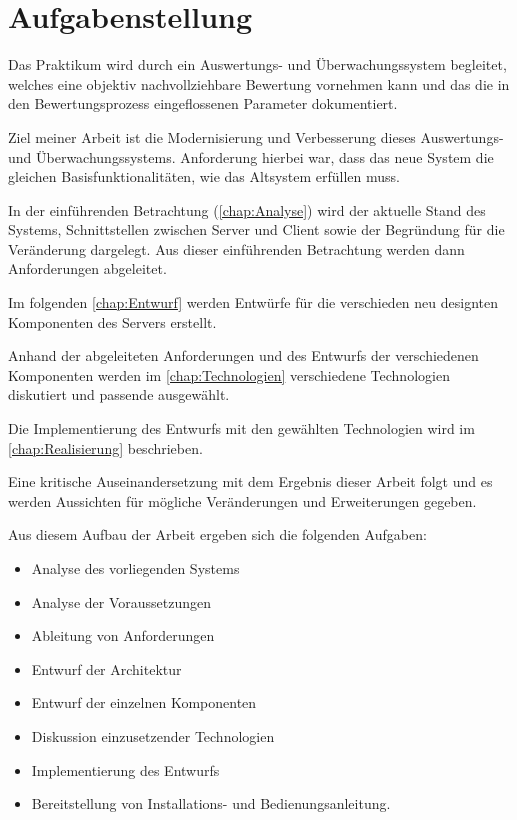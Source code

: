 \section{Aufgabenstellung}
\label{sec:Aufgabenstellung}
Das Praktikum wird durch ein Auswertungs- und Überwachungssystem begleitet, welches eine objektiv nachvollziehbare Bewertung vornehmen kann und das die in den Bewertungsprozess eingeflossenen Parameter dokumentiert. \cite[S. 2]{sosnaKonzeptionUndRealisierung2010}

Ziel meiner Arbeit ist die Modernisierung und Verbesserung dieses Auswertungs- und Überwachungssystems. Anforderung hierbei war, dass das neue System die gleichen Basisfunktionalitäten, wie das Altsystem erfüllen muss.

In der einführenden Betrachtung (\autoref{chap:Analyse}) wird der aktuelle Stand des Systems, Schnittstellen zwischen Server und Client sowie der Begründung für die Veränderung dargelegt. Aus dieser einführenden Betrachtung werden dann Anforderungen abgeleitet.

Im folgenden \autoref{chap:Entwurf} werden Entwürfe für die verschieden neu designten Komponenten des Servers erstellt. 

Anhand der abgeleiteten Anforderungen und des Entwurfs der verschiedenen Komponenten werden im \autoref{chap:Technologien} verschiedene Technologien diskutiert und passende ausgewählt.

Die Implementierung des Entwurfs mit den gewählten Technologien wird im \autoref{chap:Realisierung} beschrieben.

Eine kritische Auseinandersetzung mit dem Ergebnis dieser Arbeit folgt und es werden Aussichten für mögliche Veränderungen und Erweiterungen gegeben.

Aus diesem Aufbau der Arbeit ergeben sich die folgenden Aufgaben:
\begin{itemize}
	\item Analyse des vorliegenden Systems
	\item Analyse der Voraussetzungen
	\item Ableitung von Anforderungen
	\item Entwurf der Architektur
	\item Entwurf der einzelnen Komponenten
	\item Diskussion einzusetzender Technologien
	\item Implementierung des Entwurfs
	\item Bereitstellung von Installations- und Bedienungsanleitung.
\end{itemize}